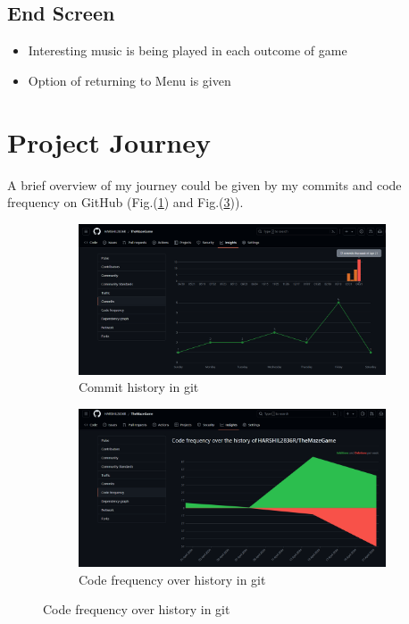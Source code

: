 \documentclass{article}
\begin{document}
\subsection{End Screen}
\begin{itemize}
    \item Interesting music is being played in each outcome of game
    \item Option of returning to Menu is given
\end{itemize}
\section{Project Journey}
A brief overview of my journey could be given by my commits and code frequency on GitHub (Fig.(\ref{fig:commit}) and Fig.(\ref{fig:code_freq})).

\begin{figure}[h]
    \caption[1]{}
    \begin{subfigure}[b]{0.45\textwidth}
        \centering
        \includegraphics[width=\textwidth]{screenshots/commits.png}
        \caption[(a)]{Commit history in git}
        \label{fig:commit}
    \end{subfigure}
    \begin{subfigure}[b]{0.45\textwidth}
        \centering
        \includegraphics[width=\textwidth]{screenshots/code_freq.png}
        \caption[(a)]{Code frequency over history in git}
        \label{fig:code_freq}
    \end{subfigure}
\end{figure}
\end{document}

